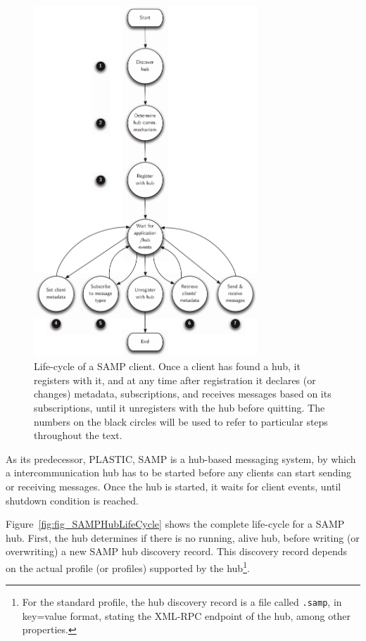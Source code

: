 		\begin{figure}[tbp]
			\centering
				\includegraphics[width=0.75\textwidth]
				{fig/SAMPClientLifeCycle.pdf}
			\caption[Life-cycle of a SAMP client]
			{
				Life-cycle of a SAMP client. Once a client has
				found a hub, it registers with it, and at any
				time after registration it declares (or changes)
				metadata, subscriptions, and receives messages
				based on its subscriptions, until it unregisters
				with the hub before quitting. The numbers
				on the black circles will be used to refer to
				particular steps throughout the text.
			}
			\label{fig:fig_SAMPClientLifeCycle}
		\end{figure}
		
		
		As its predecessor, PLASTIC, SAMP is a hub-based messaging
		system, by which a intercommunication hub has to be started
		before any clients can start sending or receiving messages.
		Once the hub is started, it waits for client events, until
		shutdown condition is reached.
		
		Figure~\ref{fig:fig_SAMPHubLifeCycle} shows the complete
		life-cycle for a SAMP hub. First, the hub determines if
		there is no running, alive hub, before writing (or 
		overwriting) a new SAMP hub discovery record.
		This discovery record depends on the actual profile (or
		profiles) supported by the hub\footnote{For the standard
		profile, the hub discovery record is a file
		called \texttt{.samp}, in key=value format, stating
		the XML-RPC endpoint of the hub, among other properties.}.
		
